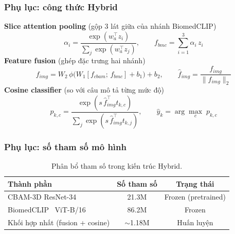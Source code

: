 \documentclass{beamer}
\numberwithin{figure}{section}
\numberwithin{table}{section}
\begin{document}
\appendix
\begin{frame}
\frametitle{Phụ lục: công thức Hybrid}
\vfill
\textbf{Slice attention pooling} {\small (gộp 3 lát giữa của nhánh BiomedCLIP)}
\begin{equation*}
\alpha_i = \frac{\exp(w_a^{\top} z_i)}{\sum_{j}\exp(w_a^{\top} z_j)}, \qquad f_{bmc} = \sum_{i=1}^{3} \alpha_i\, z_i
\end{equation*}
\vfill
\textbf{Feature fusion} {\small (ghép đặc trưng hai nhánh)}
\begin{equation*}
f_{img} = W_2\,\phi\big(W_1 [f_{cbam};\, f_{bmc}] + b_1\big) + b_2, \qquad \hat{f}_{img} = \frac{f_{img}}{\|f_{img}\|_2}
\end{equation*}
\vfill
\textbf{Cosine classifier} {\small (so với câu mô tả từng mức độ)}
\begin{equation*}
p_{k,c} = \frac{\exp(s\,\hat{f}_{img}^{\top} t_{k,c})}{\sum_{j}\exp(s\,\hat{f}_{img}^{\top} t_{k,j})}, \qquad \hat{y}_k = \arg\max_{c}\; p_{k,c}
\end{equation*}
\vfill
\end{frame}

\begin{frame}
\frametitle{Phụ lục: số tham số mô hình}
\begin{table}
\centering
\begin{tabular}{lcc}
\toprule
\textbf{Thành phần} & \textbf{Số tham số} & \textbf{Trạng thái} \\
\midrule
CBAM-3D ResNet-34 & 21.3M & Frozen (pretrained) \\
BiomedCLIP~\cite{zhang2024biomedclip} ViT-B/16 & 86.2M & Frozen \\
Khối hợp nhất (fusion + cosine) & $\sim$1.18M & Huấn luyện \\
\bottomrule
\end{tabular}
\caption{Phân bổ tham số trong kiến trúc Hybrid.}
\end{table}
\end{frame}
\end{document}
